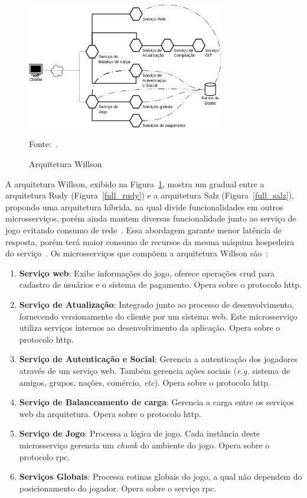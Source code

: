 \begin{figure}[htb!]
  \caption{Arquitetura Willson}
  \label{full_willson}
  \includegraphics[height=5.5cm]{arquiteturas/full_willson.png}
  \centering

  Fonte:~\cite{stephenclarkewillson2017}.
\end{figure}


A arquitetura Willson, exibido na Figura~\ref{full_willson}, mostra um gradual entre a arquitetura Rudy (Figura~\ref{full_rudy}) e a arquitetura Salz (Figura~\ref{full_salz}), propondo uma arquitetura híbrida, na qual divide funcionalidades em outros microsserviços, porém ainda mantem diversas funcionalidade junto ao serviço de jogo evitando consumo de rede~\cite{albion_online_unite, willson}.
%
Essa abordagem garante menor latência de resposta, porém terá maior consumo de recursos da mesma máquina hospedeira do serviço~\cite{willson}.
%
Os microsserviços que compõem a arquitetura Willson são~\cite{willson, stephenclarkewillson2017}:

\begin{enumerate}
  \item \textbf{Serviço web}: Exibe informações do jogo, oferece operações \ac{crud} para cadastro de usuários e o sistema de pagamento. Opera sobre o protocolo \ac{http}.
  \item \textbf{Serviço de Atualização}: Integrado junto ao processo de desenvolvimento, fornecendo versionamento do cliente por um sistema web. Este microsserviço utiliza serviços internos ao desenvolvimento da aplicação. Opera sobre o protocolo \ac{http}.
  \item \textbf{Serviço de Autenticação e Social}: Gerencia a autenticação dos jogadores através de um serviço web. Também gerencia ações sociais (\textit{e.g.} sistema de amigos, grupos, nações, comércio, \textit{etc}). Opera sobre o protocolo \ac{http}.
  \item \textbf{Serviço de Balanceamento de carga}: Gerencia a carga entre os serviços web da arquitetura. Opera sobre o protocolo \ac{http}.
  \item \textbf{Serviço de Jogo}: Processa a lógica de jogo. Cada instância deste microsserviço gerencia um \textit{chunk} do ambiente do jogo. Opera sobre o protocolo \ac{rpc}.
  \item \textbf{Serviços Globais}: Processa rotinas globais do jogo, a qual não dependem do posicionamento do jogador. Opera sobre o serviço \ac{rpc}.
\end{enumerate}

